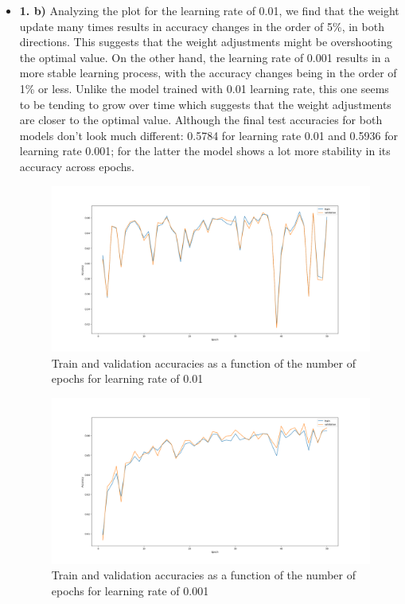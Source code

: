\documentclass[12pt]{article}
\begin{document}
\begin{itemize}
    \item \textbf{1. b)} Analyzing the plot for the learning rate of 0.01, we find that the weight update many times results in accuracy changes in the order of 5\%, in both directions. This suggests that the weight adjustments might be overshooting the optimal value. On the other hand, the learning rate of 0.001 results in a more stable learning process, with the accuracy changes being in the order of 1\% or less. Unlike the model trained with 0.01 learning rate, this one seems to be tending to grow over time which suggests that the weight adjustments are closer to the optimal value. Although the final test accuracies for both models don't look much different: 0.5784 for learning rate 0.01 and 0.5936 for learning rate 0.001; for the latter the model shows a lot more stability in its accuracy across epochs.
        \begin{figure}[H]
            \centering
            \includegraphics[width=1\linewidth]{../outputs/hw1-q1-1b.01.png}
            \caption{Train and validation accuracies as a function of the number of epochs for learning rate of 0.01}
            \label{fig:1.1b:0.01}
        \end{figure}

        \begin{figure}[H]
            \centering
            \includegraphics[width=1\linewidth]{../outputs/hw1-q1-1b.001.png}
            \caption{Train and validation accuracies as a function of the number of epochs for learning rate of 0.001}
            \label{fig:1.1b:0.001}
        \end{figure}


\end{itemize}
\end{document}
